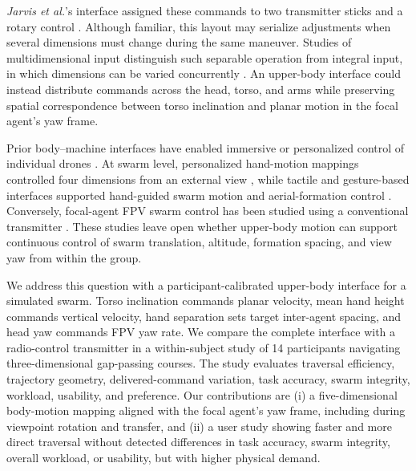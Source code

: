 \textit{Jarvis et al.}'s interface assigned these commands to two
transmitter sticks and a rotary control \cite{ben_focaldrone}. Although
familiar, this layout may serialize adjustments when several dimensions must
change during the same maneuver. Studies of multidimensional input distinguish
such separable operation from integral input, in which dimensions can be varied
concurrently \cite{jacob1994integrality,zhai1998quantifying}. An upper-body
interface could instead distribute commands across the head, torso, and arms
while preserving spatial correspondence between torso inclination and planar
motion in the focal agent's yaw frame.

Prior body--machine interfaces have enabled immersive or personalized control
of individual drones
\cite{rognon2018flyjacket,miehlbradt2018datadriven,macchini2024datadriven}.
At swarm level, personalized hand-motion mappings controlled four dimensions
from an external view \cite{macchini2021personalized}, while tactile and
gesture-based interfaces supported hand-guided swarm motion and aerial-formation
control \cite{tsykunov2019swarmtouch,kratky2025gesture}. Conversely,
focal-agent FPV swarm control has been studied using a conventional transmitter
\cite{ben_focaldrone}. These studies leave open whether upper-body motion can
support continuous control of swarm translation, altitude, formation spacing,
and view yaw from within the group.




We address this question with a participant-calibrated upper-body interface for
a simulated swarm. Torso inclination commands
planar velocity, mean hand height commands vertical velocity, hand separation
sets target inter-agent spacing, and head yaw commands FPV yaw rate. We compare
the complete interface with a radio-control transmitter in a within-subject
study of 14 participants navigating three-dimensional gap-passing courses. The study evaluates traversal efficiency, trajectory geometry,
delivered-command variation, task accuracy, swarm integrity, workload,
usability, and preference. Our contributions are (i) a five-dimensional body-motion mapping
aligned with the focal agent's yaw frame, including during viewpoint rotation
and transfer, and (ii) a user study showing faster and more direct traversal without
detected differences in task accuracy, swarm integrity, overall workload, or
usability, but with higher physical demand. 



